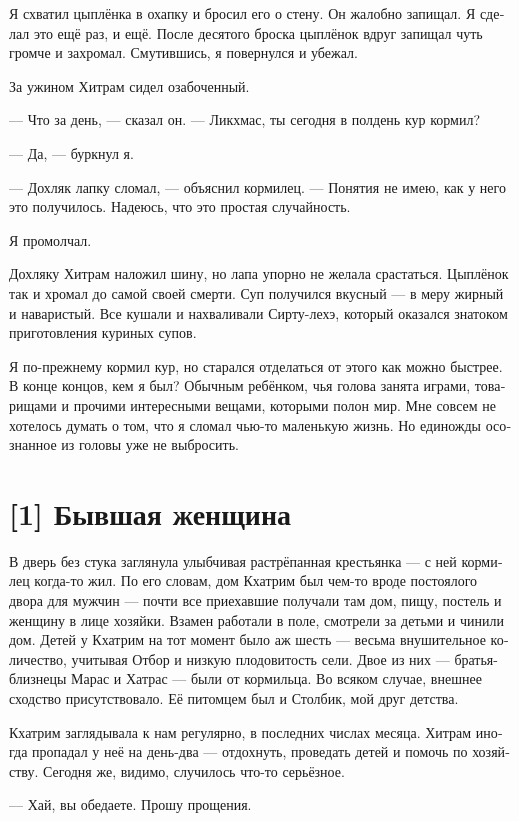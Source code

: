 \documentclass[a4paper,12pt,fleqn]{book}\usepackage{polyglossia}\setdefaultlanguage[babelshorthands=true]{russian}\setotherlanguage{english}\defaultfontfeatures{Ligatures=TeX,Mapping=tex-text}\usepackage{xcolor}\newcommand{\ml}[3]{#2}
\begin{document}
{Я схватил цыплёнка в охапку и бросил его о стену.
Он жалобно запищал.
Я сделал это ещё раз, и ещё.
После десятого броска цыплёнок вдруг запищал чуть громче и захромал.
Смутившись, я повернулся и убежал.

За ужином Хитрам сидел озабоченный.

--- Что за день, --- сказал он.
--- Ликхмас, ты сегодня в полдень кур кормил?

--- Да, --- буркнул я.

--- Дохляк лапку сломал, --- объяснил кормилец.
--- Понятия не имею, как у него это получилось.
Надеюсь, что это простая случайность.

Я промолчал.

Дохляку Хитрам наложил шину, но лапа упорно не желала срастаться.
Цыплёнок так и хромал до самой своей смерти.
Суп получился вкусный --- в меру жирный и наваристый.
Все кушали и нахваливали Сирту-лехэ, который оказался знатоком приготовления куриных супов.

Я по-прежнему кормил кур, но старался отделаться от этого как можно быстрее.
В конце концов, кем я был?
Обычным ребёнком, чья голова занята играми, товарищами и прочими интересными вещами, которыми полон мир.
Мне совсем не хотелось думать о том, что я сломал чью-то маленькую жизнь.
Но единожды осознанное из головы уже не выбросить.

\section{[1] Бывшая женщина}

В дверь без стука заглянула улыбчивая растрёпанная крестьянка --- с ней кормилец когда-то жил.
По его словам, дом Кхатрим был чем-то вроде постоялого двора для мужчин --- почти все приехавшие получали там дом, пищу, постель и женщину в лице хозяйки.
Взамен работали в поле, смотрели за детьми и чинили дом.
Детей у Кхатрим на тот момент было аж шесть --- весьма внушительное количество, учитывая Отбор и низкую плодовитость сели.
Двое из них --- братья-близнецы Марас и Хатрас --- были от кормильца.
Во всяком случае, внешнее сходство присутствовало.
Её питомцем был и Столбик, мой друг детства.

Кхатрим заглядывала к нам регулярно, в последних числах месяца.
Хитрам иногда пропадал у неё на день-два --- отдохнуть, проведать детей и помочь по хозяйству.
Сегодня же, видимо, случилось что-то серьёзное.

--- Хай, вы обедаете.
Прошу прощения.

}
\end{document}

